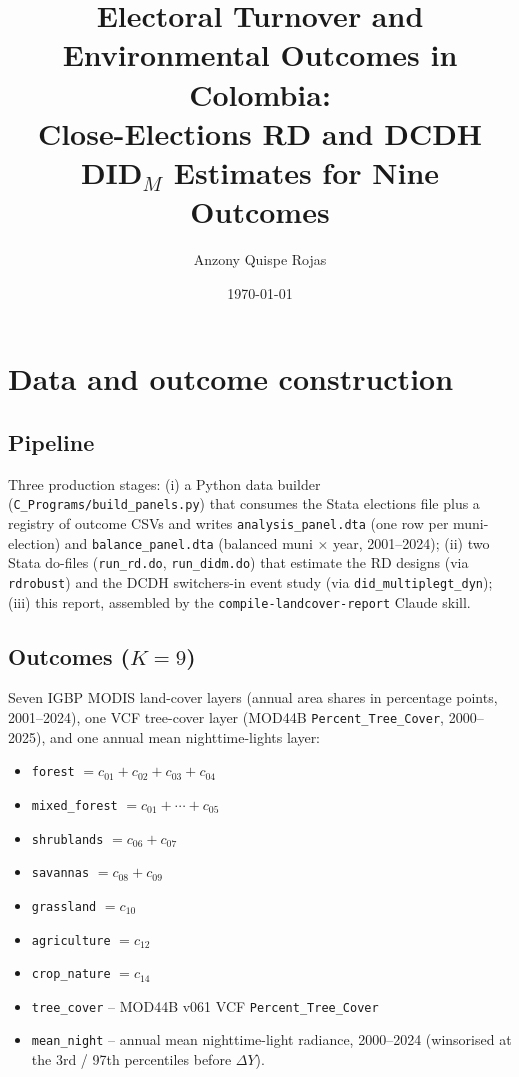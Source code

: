 \documentclass[11pt]{article}
\title{Electoral Turnover and Environmental Outcomes in Colombia:\\
       Close-Elections RD and DCDH DID$_M$ Estimates for Nine Outcomes}
\author{Anzony Quispe Rojas}
\date{\today}
\begin{document}
\maketitle
\tableofcontents
\clearpage

\section{Data and outcome construction}

\subsection{Pipeline}

Three production stages: (i) a Python data builder
(\texttt{C\_Programs/build\_panels.py}) that consumes the Stata
elections file plus a registry of outcome CSVs and writes
\texttt{analysis\_panel.dta} (one row per muni-election) and
\texttt{balance\_panel.dta} (balanced muni $\times$ year, 2001--2024);
(ii) two Stata do-files (\texttt{run\_rd.do}, \texttt{run\_didm.do})
that estimate the RD designs (via \texttt{rdrobust}) and the DCDH
switchers-in event study (via \texttt{did\_multiplegt\_dyn}); (iii)
this report, assembled by the \texttt{compile-landcover-report}
Claude skill.

\subsection{Outcomes ($K=9$)}

Seven IGBP MODIS land-cover layers (annual area shares in percentage
points, 2001--2024), one VCF tree-cover layer (MOD44B
\texttt{Percent\_Tree\_Cover}, 2000--2025), and one annual mean
nighttime-lights layer:

\begin{itemize}
  \item \texttt{forest} $= c_{01}+c_{02}+c_{03}+c_{04}$
  \item \texttt{mixed\_forest} $= c_{01}+\cdots+c_{05}$
  \item \texttt{shrublands} $= c_{06}+c_{07}$
  \item \texttt{savannas} $= c_{08}+c_{09}$
  \item \texttt{grassland} $= c_{10}$
  \item \texttt{agriculture} $= c_{12}$
  \item \texttt{crop\_nature} $= c_{14}$
  \item \texttt{tree\_cover} -- MOD44B v061 VCF
        \texttt{Percent\_Tree\_Cover}
  \item \texttt{mean\_night} -- annual mean nighttime-light radiance,
        2000--2024 (winsorised at the 3rd / 97th percentiles before
        $\Delta Y$).
\end{itemize}
\end{document}
